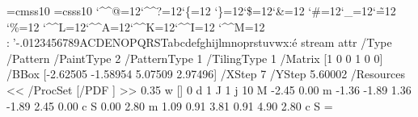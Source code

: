\font\THFa=cmss10
\font\THFb=csss10
\begingroup
\catcode`\^^@=12\catcode`\^^?=12\catcode`\{=12
\catcode`\}=12\catcode`\$=12\catcode`\&=12
\catcode`\#=12\catcode`\_=12\catcode`\~=12
\catcode`\%=12
\catcode`\^^L=12\catcode`\^^A=12\catcode`\^^K=12\catcode`\^^I=12
\catcode`\^^M=12
\THFa:^^12'-.0123456789ACDENOPQRSTabcdefghijlmnoprstuvwx\endinclude{}\THFb:^^e9\endinclude\endgroup
\immediate\pdfobj stream attr {/Type /Pattern
/PaintType 2 /PatternType 1 /TilingType 1
/Matrix [1 0 0 1 0 0]
/BBox [-2.62505 -1.58954 5.07509 2.97496]
/XStep 7
/YStep 5.60002
/Resources << /ProcSet [/PDF ] >>} {
0.35 w
[] 0 d
1 J
1 j
10 M
-2.45 0.00 m
-1.36 -1.89 1.36 -1.89 2.45 0.00 c
S
0.00 2.80 m
1.09 0.91 3.81 0.91 4.90 2.80 c
S
} \newcount \THPa\THPa=\pdflastobj
